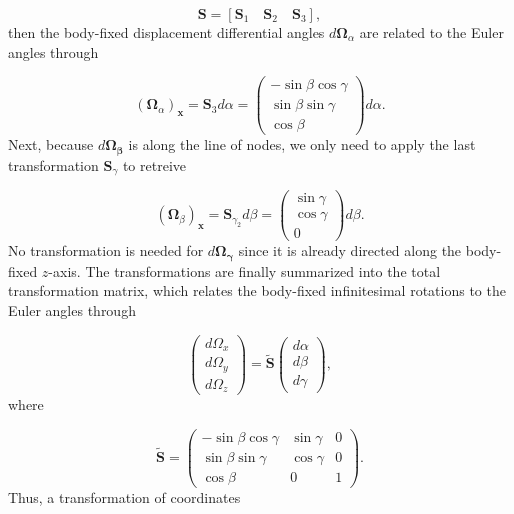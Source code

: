 \begin{equation}
\mathbf{S} = [\mathbf{S}_1 \quad \mathbf{S}_2 \quad \mathbf{S}_3],
\end{equation}
then the body-fixed displacement differential angles $d\mathbf{\Omega}_{\alpha}$ are related to the Euler angles through

\begin{equation}
(\mathbf{\Omega}_{\alpha})_{\mathbf{x}} = \mathbf{S}_3 d\alpha= 
\begin{pmatrix}
-\sin\beta \cos\gamma \\
\sin\beta \sin\gamma \\
\cos\beta
\end{pmatrix} d\alpha.
\end{equation}
Next, because $d\mathbf{\Omega_{\beta}}$ is along the line of nodes, we only need to apply the last transformation $\mathbf{S}_{\gamma}$ to retreive

\begin{equation}
(\mathbf{\Omega}_{\beta})_{\mathbf{x}} = \mathbf{S}_{\gamma_2} d\beta= 
\begin{pmatrix}
\sin\gamma \\
\cos\gamma \\
0
\end{pmatrix} d\beta.
\end{equation}
No transformation is needed for $d\mathbf{\Omega_{\gamma}}$ since it is already directed along the body-fixed $z$-axis. The transformations are finally summarized into the total transformation matrix, which relates the body-fixed infinitesimal rotations to the Euler angles through

\begin{equation}
\begin{pmatrix}
d\Omega_x\\
d\Omega_y\\
d\Omega_z
\end{pmatrix}
=
\tilde{\mathbf{S}}\begin{pmatrix}
d\alpha\\
d\beta\\
d\gamma
\end{pmatrix},
\end{equation}
where

\begin{equation}\label{eq:S_matrix}
\tilde{\mathbf{S}}=
\begin{pmatrix}
-\sin\beta\cos\gamma & \sin\gamma & 0\\
\sin\beta\sin\gamma  & \cos\gamma & 0\\
\cos\beta 			 & 0          & 1
\end{pmatrix}.
\end{equation}
Thus, a transformation of coordinates

